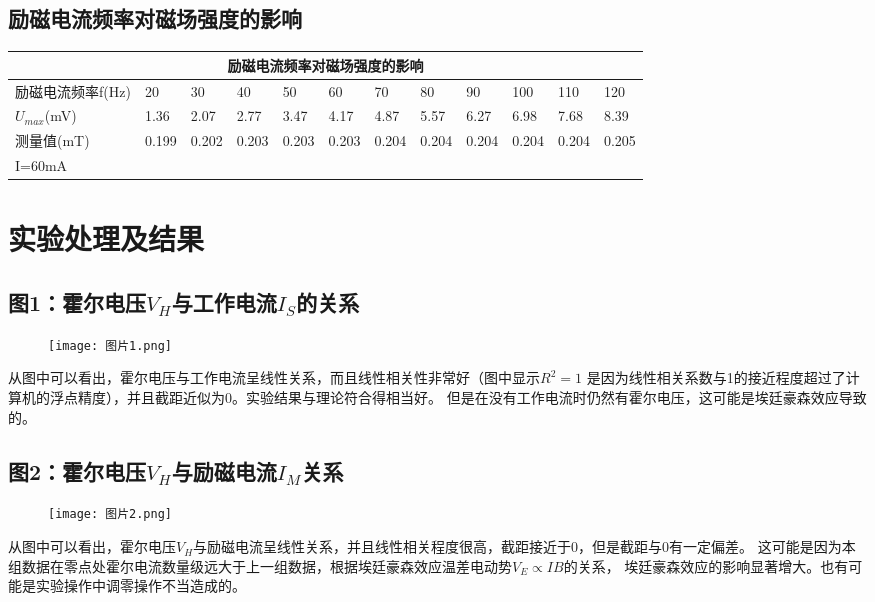 \documentclass[12pt,a4paper]{article}
\newcommand*{\song}{\CJKfamily{zhsong}}
\newcommand{\sectionfont}{\song\textbf}
\begin{document}
    \subsection{励磁电流频率对磁场强度的影响}
    \begin{table}[H]
        \centering
        \begin{tabular}{|l|l|l|l|l|l|l|l|l|l|l|l|}
        \hline
            \multicolumn{12}{|c|}{励磁电流频率对磁场强度的影响}  \\ \hline
            励磁电流频率f(Hz) & 20 & 30 & 40 & 50 & 60 & 70 & 80 & 90 & 100 & 110 & 120 \\ \hline
            $U_{max}$(mV) & 1.36 & 2.07 & 2.77 & 3.47 & 4.17 & 4.87 & 5.57 & 6.27 & 6.98 & 7.68 & 8.39 \\ \hline
            测量值(mT) & 0.199 & 0.202 & 0.203 & 0.203 & 0.203 & 0.204 & 0.204 & 0.204 & 0.204 & 0.204 & 0.205 \\ \hline
            \multicolumn{12}{|l|}{I=60mA} \\ \hline
        \end{tabular}
    \end{table}

\section{\sectionfont 实验处理及结果}
    \subsection{图1：霍尔电压$V_H$与工作电流$I_S$的关系}
    \begin{figure}[H]
        \centering
        \texttt{[image: 图片1.png]}
    \end{figure}

    从图中可以看出，霍尔电压与工作电流呈线性关系，而且线性相关性非常好（图中显示$R^2=1$
    是因为线性相关系数与1的接近程度超过了计算机的浮点精度），并且截距近似为0。实验结果与理论符合得相当好。
    但是在没有工作电流时仍然有霍尔电压，这可能是埃廷豪森效应导致的。

    \subsection{图2：霍尔电压$V_H$与励磁电流$I_M$关系}
    \begin{figure}[H]
        \centering
        \texttt{[image: 图片2.png]}
    \end{figure}

    从图中可以看出，霍尔电压$V_H$与励磁电流呈线性关系，并且线性相关程度很高，截距接近于0，但是截距与0有一定偏差。
    这可能是因为本组数据在零点处霍尔电流数量级远大于上一组数据，根据埃廷豪森效应温差电动势$V_E\propto{IB}$的关系，
    埃廷豪森效应的影响显著增大。也有可能是实验操作中调零操作不当造成的。
\end{document}
